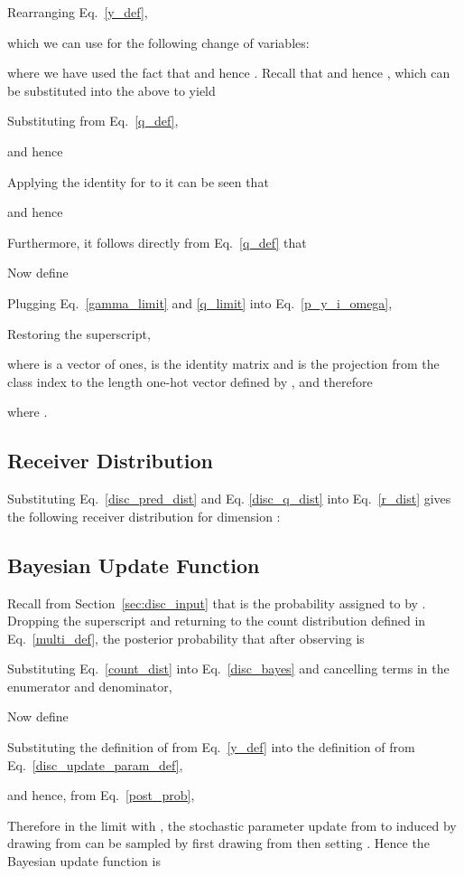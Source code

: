 \documentclass[11pt,table]{article}
\newcommand{\0}[1]{\constvec{0}{#1}}
\newcommand{\1}[1]{\constvec{1}{#1}}
\begin{document}
Rearranging Eq.~\ref{y_def},

which we can use for the following change of variables:

where we have used the fact that  and hence . 
Recall that  and hence ,
 which can be substituted into the above to yield

Substituting from Eq.~\ref{q_def},

and hence

Applying the identity  for   to  it can be seen that

and hence

Furthermore, it follows directly from Eq.~\ref{q_def} that

Now define

Plugging Eq.~\ref{gamma_limit} and \ref{q_limit} into Eq.~\ref{p_y_i_omega},

Restoring the superscript,

where  is a vector of ones,  is the identity matrix and  is the projection from the class index  to the length  one-hot vector defined by , and therefore

where .
\subsection{Receiver Distribution \texorpdfstring{}{}}
Substituting Eq.~\ref{disc_pred_dist} and Eq. \ref{disc_q_dist} into Eq.~\ref{r_dist} gives the following receiver distribution for dimension :

\subsection{Bayesian Update Function \texorpdfstring{}{}}
Recall from Section~\ref{sec:disc_input} that  is the probability assigned to  by .
Dropping the superscript and returning to the count distribution  defined in Eq.~\ref{multi_def}, the posterior probability that  after observing  is

Substituting Eq.~\ref{count_dist} into Eq.~\ref{disc_bayes} and cancelling terms in the enumerator and denominator,

Now define

Substituting the definition of  from Eq.~\ref{y_def} into the definition of  from Eq.~\ref{disc_update_param_def},

and hence, from Eq.~\ref{post_prob},

Therefore in the limit  with , the stochastic parameter update from  to  induced by drawing  from  can be sampled by first drawing  from  then setting .
Hence the Bayesian update function is 
\end{document}
